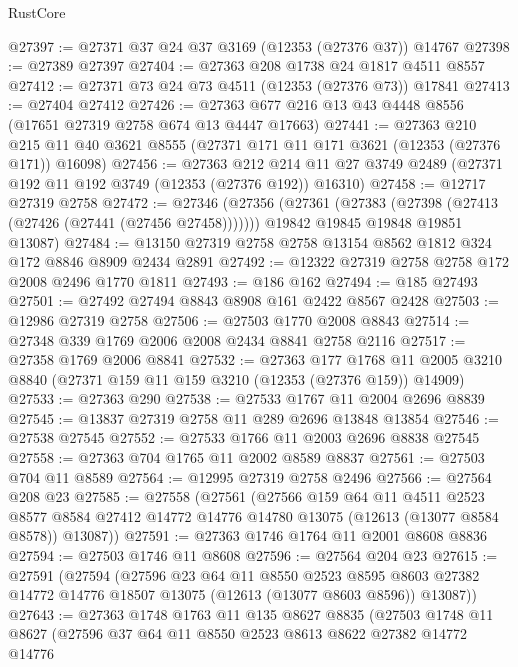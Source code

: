 \begin{lexlean}{RustCore}
\begin{coremodule}
@27397 := @27371 @37 @24 @37 @3169 (@12353 (@27376 @37)) @14767
@27398 := @27389 @27397
@27404 := @27363 @208 @1738 @24 @1817 @4511 @8557
@27412 := @27371 @73 @24 @73 @4511 (@12353 (@27376 @73)) @17841
@27413 := @27404 @27412
@27426 := @27363 @677 @216 @13 @43 @4448 @8556 (@17651 @27319 @2758 @674 @13 @4447 @17663)
@27441 := @27363
    @210
    @215
    @11
    @40
    @3621
    @8555
    (@27371 @171 @11 @171 @3621 (@12353 (@27376 @171)) @16098)
@27456 := @27363
    @212
    @214
    @11
    @27
    @3749
    @2489
    (@27371 @192 @11 @192 @3749 (@12353 (@27376 @192)) @16310)
@27458 := @12717 @27319 @2758
@27472 := @27346
    (@27356
      (@27361 (@27383 (@27398 (@27413 (@27426 (@27441 (@27456 @27458)))))))
      @19842
      @19845
      @19848
      @19851
      @13087)
@27484 := @13150 @27319 @2758 @2758 @13154 @8562 @1812 @324 @172 @8846 @8909 @2434 @2891
@27492 := @12322 @27319 @2758 @2758 @172 @2008 @2496 @1770 @1811
@27493 := @186 @162
@27494 := @185 @27493
@27501 := @27492 @27494 @8843 @8908 @161 @2422 @8567 @2428
@27503 := @12986 @27319 @2758
@27506 := @27503 @1770 @2008 @8843
@27514 := @27348 @339 @1769 @2006 @2008 @2434 @8841 @2758 @2116
@27517 := @27358 @1769 @2006 @8841
@27532 := @27363
    @177
    @1768
    @11
    @2005
    @3210
    @8840
    (@27371 @159 @11 @159 @3210 (@12353 (@27376 @159)) @14909)
@27533 := @27363 @290
@27538 := @27533 @1767 @11 @2004 @2696 @8839
@27545 := @13837 @27319 @2758 @11 @289 @2696 @13848 @13854
@27546 := @27538 @27545
@27552 := @27533 @1766 @11 @2003 @2696 @8838 @27545
@27558 := @27363 @704 @1765 @11 @2002 @8589 @8837
@27561 := @27503 @704 @11 @8589
@27564 := @12995 @27319 @2758 @2496
@27566 := @27564 @208 @23
@27585 := @27558
    (@27561
      (@27566
        @159
        @64
        @11
        @4511
        @2523
        @8577
        @8584
        @27412
        @14772
        @14776
        @14780
        @13075
        (@12613 (@13077 @8584 @8578))
        @13087))
@27591 := @27363 @1746 @1764 @11 @2001 @8608 @8836
@27594 := @27503 @1746 @11 @8608
@27596 := @27564 @204 @23
@27615 := @27591
    (@27594
      (@27596
        @23
        @64
        @11
        @8550
        @2523
        @8595
        @8603
        @27382
        @14772
        @14776
        @18507
        @13075
        (@12613 (@13077 @8603 @8596))
        @13087))
@27643 := @27363
    @1748
    @1763
    @11
    @135
    @8627
    @8835
    (@27503
      @1748
      @11
      @8627
      (@27596
        @37
        @64
        @11
        @8550
        @2523
        @8613
        @8622
        @27382
        @14772
        @14776

\end{coremodule}
\end{lexlean}
